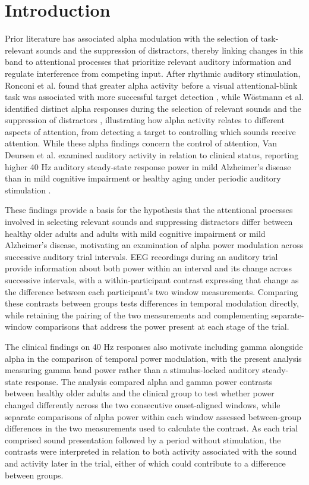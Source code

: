 \documentclass[11pt,letterpaper]{article}
\begin{document}
\section{Introduction}
Prior literature has associated alpha modulation with the selection of task-relevant sounds and the suppression of distractors, thereby linking changes in this band to attentional processes that prioritize relevant auditory information and regulate interference from competing input. After rhythmic auditory stimulation, Ronconi et al. found that greater alpha activity before a visual attentional-blink task was associated with more successful target detection \cite{ronconi}, while W\"ostmann et al. identified distinct alpha responses during the selection of relevant sounds and the suppression of distractors \cite{wostmann}, illustrating how alpha activity relates to different aspects of attention, from detecting a target to controlling which sounds receive attention. While these alpha findings concern the control of attention, Van Deursen et al. examined auditory activity in relation to clinical status, reporting higher 40 Hz auditory steady-state response power in mild Alzheimer's disease than in mild cognitive impairment or healthy aging under periodic auditory stimulation \cite{vandeursen}.

These findings provide a basis for the hypothesis that the attentional processes involved in selecting relevant sounds and suppressing distractors differ between healthy older adults and adults with mild cognitive impairment or mild Alzheimer's disease, motivating an examination of alpha power modulation across successive auditory trial intervals. EEG recordings during an auditory trial provide information about both power within an interval and its change across successive intervals, with a within-participant contrast expressing that change as the difference between each participant's two window measurements. Comparing these contrasts between groups tests differences in temporal modulation directly, while retaining the pairing of the two measurements and complementing separate-window comparisons that address the power present at each stage of the trial.

The clinical findings on 40 Hz responses also motivate including gamma alongside alpha in the comparison of temporal power modulation, with the present analysis measuring gamma band power rather than a stimulus-locked auditory steady-state response. The analysis compared alpha and gamma power contrasts between healthy older adults and the clinical group to test whether power changed differently across the two consecutive onset-aligned windows, while separate comparisons of alpha power within each window assessed between-group differences in the two measurements used to calculate the contrast. As each trial comprised sound presentation followed by a period without stimulation, the contrasts were interpreted in relation to both activity associated with the sound and activity later in the trial, either of which could contribute to a difference between groups.
\end{document}
